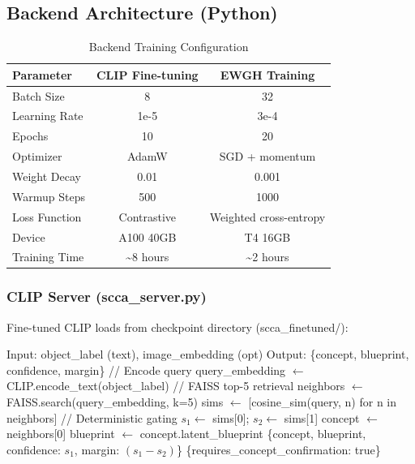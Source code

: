 \documentclass[conference]{IEEEtran}
\begin{document}
\subsection{Backend Architecture (Python)}

\begin{table}[h]
\centering
\caption{Backend Training Configuration}
\label{tab:backend_config}
\begin{tabular}{lcc}
\toprule
\textbf{Parameter} & \textbf{CLIP Fine-tuning} & \textbf{EWGH Training} \\
\midrule
Batch Size & 8 & 32 \\
Learning Rate & 1e-5 & 3e-4 \\
Epochs & 10 & 20 \\
Optimizer & AdamW & SGD + momentum \\
Weight Decay & 0.01 & 0.001 \\
Warmup Steps & 500 & 1000 \\
Loss Function & Contrastive & Weighted cross-entropy \\
Device & A100 40GB & T4 16GB \\
Training Time & \textasciitilde 8 hours & \textasciitilde 2 hours \\
\bottomrule
\end{tabular}
\end{table}

\subsubsection{CLIP Server (scca\_server.py)}

Fine-tuned CLIP loads from checkpoint directory (scca\_finetuned/):

\begin{algorithm}
\caption{CLIP Semantic Retrieval with Gating}
\label{alg:clipretrieval}
\begin{algorithmic}
\STATE Input: object\_label (text), image\_embedding (opt)
\STATE Output: \{concept, blueprint, confidence, margin\}
\STATE
\STATE // Encode query
\STATE query\_embedding $\leftarrow$ CLIP.encode\_text(object\_label)
\STATE
\STATE // FAISS top-5 retrieval
\STATE neighbors $\leftarrow$ FAISS.search(query\_embedding, k=5)
\STATE sims $\leftarrow$ [cosine\_sim(query, n) for n in neighbors]
\STATE
\STATE // Deterministic gating
\STATE $s_1 \leftarrow$ sims[0]; $s_2 \leftarrow$ sims[1]
  \STATE concept $\leftarrow$ neighbors[0]
  \STATE blueprint $\leftarrow$ concept.latent\_blueprint
  \STATE \RETURN \{concept, blueprint, confidence: $s_1$, margin: $(s_1-s_2)$\}
\ELSE
  \STATE \RETURN \{requires\_concept\_confirmation: true\}
\ENDIF
\end{algorithmic}
\end{algorithm}
\end{document}
